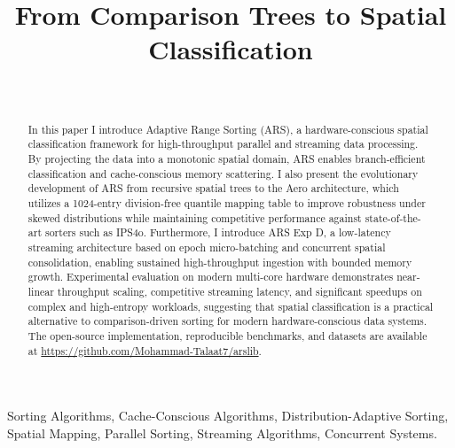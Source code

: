 \documentclass[journal,twoside]{IEEEtran}
\title{From Comparison Trees to Spatial Classification}
\author{\IEEEauthorblockN{Mohammad~T.~Ismael} \\
\IEEEauthorblockA{Cairo, Egypt \\
mohamed.talaat.ismael@gmail.com}}
\begin{document}
\maketitle

\begin{abstract}
In this paper I introduce Adaptive Range Sorting (ARS), a hardware-conscious spatial classification framework for high-throughput parallel and streaming data processing.
By projecting the data into a monotonic spatial domain, ARS enables branch-efficient classification and cache-conscious memory scattering.
I also present the evolutionary development of ARS from recursive spatial trees to the Aero architecture, which utilizes a 1024-entry division-free quantile mapping table to improve robustness under skewed distributions while maintaining competitive performance against state-of-the-art sorters such as IPS4o.
Furthermore, I introduce ARS Exp D, a low-latency streaming architecture based on epoch micro-batching and concurrent spatial consolidation, enabling sustained high-throughput ingestion with bounded memory growth.
Experimental evaluation on modern multi-core hardware demonstrates near-linear throughput scaling, competitive streaming latency, and significant speedups on complex and high-entropy workloads, suggesting that spatial classification is a practical alternative to comparison-driven sorting for modern hardware-conscious data systems.
The open-source implementation, reproducible benchmarks, and datasets are available at \url{https://github.com/Mohammad-Talaat7/arslib}.
\end{abstract}

\begin{IEEEkeywords}
Sorting Algorithms, Cache-Conscious Algorithms, Distribution-Adaptive Sorting, Spatial Mapping, Parallel Sorting, Streaming Algorithms, Concurrent Systems.
\end{IEEEkeywords}











\end{document}
